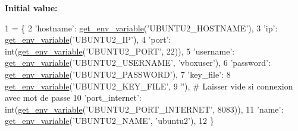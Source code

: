 {\bfseries Initial value\+:}
\begin{DoxyCode}
1 =  \{
2     \textcolor{stringliteral}{'hostname'}: \hyperlink{namespaceconfig_a7cf1bd9315cd5f3237441a2d9414082d}{get\_env\_variable}(\textcolor{stringliteral}{'UBUNTU2\_HOSTNAME'}),
3     \textcolor{stringliteral}{'ip'}: \hyperlink{namespaceconfig_a7cf1bd9315cd5f3237441a2d9414082d}{get\_env\_variable}(\textcolor{stringliteral}{'UBUNTU2\_IP'}),
4     \textcolor{stringliteral}{'port'}: int(\hyperlink{namespaceconfig_a7cf1bd9315cd5f3237441a2d9414082d}{get\_env\_variable}(\textcolor{stringliteral}{'UBUNTU2\_PORT'}, 22)),
5     \textcolor{stringliteral}{'username'}: \hyperlink{namespaceconfig_a7cf1bd9315cd5f3237441a2d9414082d}{get\_env\_variable}(\textcolor{stringliteral}{'UBUNTU2\_USERNAME'}, \textcolor{stringliteral}{'vboxuser'}),
6     \textcolor{stringliteral}{'password'}: \hyperlink{namespaceconfig_a7cf1bd9315cd5f3237441a2d9414082d}{get\_env\_variable}(\textcolor{stringliteral}{'UBUNTU2\_PASSWORD'}),
7     \textcolor{stringliteral}{'key\_file'}:
8     \hyperlink{namespaceconfig_a7cf1bd9315cd5f3237441a2d9414082d}{get\_env\_variable}(\textcolor{stringliteral}{'UBUNTU2\_KEY\_FILE'},
9                      \textcolor{stringliteral}{''}),  \textcolor{comment}{# Laisser vide si connexion avec mot de passe}
10     \textcolor{stringliteral}{'port\_internet'}: int(\hyperlink{namespaceconfig_a7cf1bd9315cd5f3237441a2d9414082d}{get\_env\_variable}(\textcolor{stringliteral}{'UBUNTU2\_PORT\_INTERNET'}, 8083)),
11     \textcolor{stringliteral}{'name'}: \hyperlink{namespaceconfig_a7cf1bd9315cd5f3237441a2d9414082d}{get\_env\_variable}(\textcolor{stringliteral}{'UBUNTU2\_NAME'}, \textcolor{stringliteral}{'ubuntu2'}),
12 \}
\end{DoxyCode}
